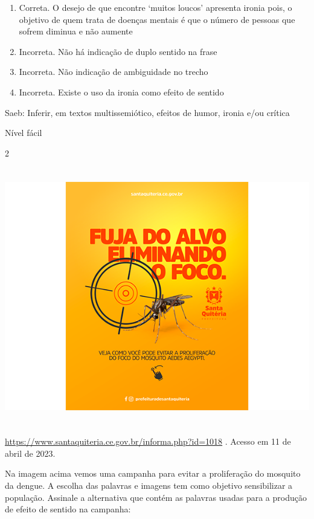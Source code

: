 {\begin{enumerate}
\def\labelenumi{\alph{enumi})}
\item
  Correta. O desejo de que encontre `muitos loucos' apresenta ironia
  pois, o objetivo de quem trata de doenças mentais é que o número de
  pessoas que sofrem diminua e não aumente
\item
  Incorreta. Não há indicação de duplo sentido na frase
\item
  Incorreta. Não indicação de ambiguidade no trecho
\item
  Incorreta. Existe o uso da ironia como efeito de sentido
\end{enumerate}

Saeb: Inferir, em textos multissemiótico, efeitos de humor, ironia e/ou
crítica

Nível fácil

\num{2}

\includegraphics[width=5.90551in,height=4.43056in]{./imgSAEB_7_POR/media/image6.png}

\href{https://www.santaquiteria.ce.gov.br/informa.php?id=1018}{\uline{https://www.santaquiteria.ce.gov.br/informa.php?id=1018}}
. Acesso em 11 de abril de 2023.

Na imagem acima vemos uma campanha para evitar a proliferação do
mosquito da dengue. A escolha das palavras e imagens tem como objetivo
sensibilizar a população. Assinale a alternativa que contém as palavras
usadas para a produção de efeito de sentido na campanha:

}
